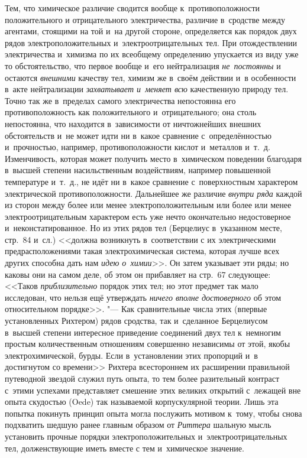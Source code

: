 Тем, что химическое различие сводится вообще к~противоположности положительного
и отрицательного электричества, различие в~сродстве между агентами, стоящими на
той и~на другой стороне, определяется как порядок двух рядов
электроположительных и~электроотрицательных тел. При отождествлении
электричества и~химизма по их всеобщему определению упускается из виду уже то
обстоятельство, что первое вообще и~его нейтрализация {\em не~постоянны} и
остаются {\em внешними} качеству тел, химизм же в~своём действии и~в
особенности в~акте нейтрализации {\em захватывает и~меняет всю} качественную
природу тел. Точно так же в~пределах самого электричества непостоянна его
противоположность как положительного и~отрицательного; она столь непостоянна,
что находится в~зависимости от ничтожнейших внешних обстоятельств и~не может
идти ни в~какое сравнение с~определённостью и~прочностью, например,
противоположности кислот и~металлов и~т.~д. Изменчивость, которая может
получить место в~химическом поведении благодаря в~высшей степени насильственным
воздействиям, например повышенной температуре и~т.~д., не идёт ни в~какое
сравнение с~поверхностным характером электрической противоположности.
Дальнейшее же различие {\em внутри ряда} каждой из сторон между более или менее
электроположительным или более или менее электроотрицательным характером есть
уже нечто окончательно недостоверное и~неконстатированное. Но из этих рядов тел
(Берцелиус в~указанном месте, стр.~84 и~сл.) <<должна возникнуть в~соответствии
с их электрическими предрасположениями такая электрохимическая система, которая
лучше всех других способна дать нам {\em идею о~химии}>>. Он затем указывает
эти ряды; но каковы они на самом деле, об этом он прибавляет на стр.~67
следующее: <<Таков {\em приблизительно} порядок этих тел; но этот предмет так
мало исследован, что нельзя ещё утверждать {\em ничего вполне достоверного} об
этом относительном порядке>>. "--- Как сравнительные числа этих (впервые
установленных Рихтером) рядов сродства, так и~сделанное Берцелиусом в~высшей
степени интересное приведение соединений двух тел к~немногим простым
количественным отношениям совершенно независимы от этой, якобы
электрохимической, бурды. Если в~установлении этих пропорций и~в достигнутом со
времени>> Рихтера всестороннем их расширении правильной путеводной звездой
служил путь опыта, то тем более разительный контраст с~этими успехами
представляет смешение этих великих открытий с~лежащей вне опыта скудостью
(Oede) так называемой корпускулярной теории. Лишь эта попытка покинуть принцип
опыта могла послужить мотивом к~тому, чтобы снова подхватить шедшую ранее
главным образом от {\em Риттера} шальную мысль установить прочные порядки
электроположительных и~электроотрицательных тел, долженствующие иметь вместе с
тем и~химическое значение.

